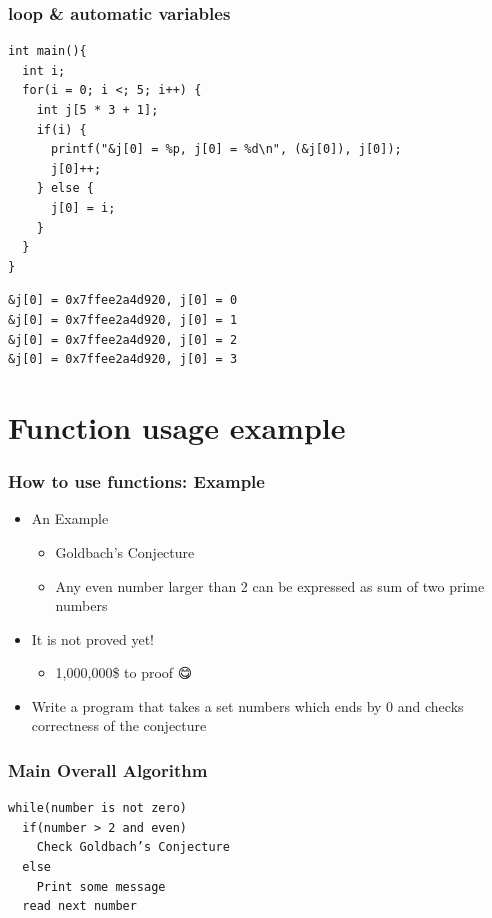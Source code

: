 \documentclass{../c-lecture}
\begin{document}
\begin{frame}[fragile]
  \frametitle{loop \& automatic variables}
  \begin{verbatim}
int main(){
  int i;
  for(i = 0; i <; 5; i++) {
    int j[5 * 3 + 1];
    if(i) {
      printf("&j[0] = %p, j[0] = %d\n", (&j[0]), j[0]);
      j[0]++;
    } else {
      j[0] = i;
    }
  }
}
  \end{verbatim}
\end{frame}

\begin{frame}[fragile]
  \begin{verbatim}
&j[0] = 0x7ffee2a4d920, j[0] = 0
&j[0] = 0x7ffee2a4d920, j[0] = 1
&j[0] = 0x7ffee2a4d920, j[0] = 2
&j[0] = 0x7ffee2a4d920, j[0] = 3
  \end{verbatim}
\end{frame}

\section{Function usage example}

\begin{frame}
  \frametitle{How to use functions: Example}
  \begin{itemize}
    \item An Example
    \begin{itemize}
      \item Goldbach’s Conjecture
      \item
        Any even number larger than 2 can be expressed as sum of two prime
        numbers

    \end{itemize}
    \item It is not proved yet!
    \begin{itemize}
      \item 1,000,000\$ to proof 😋
    \end{itemize}
    \item
      Write a program that takes a set numbers which ends by 0 and checks
      correctness of the conjecture
  \end{itemize}
\end{frame}

\begin{frame}[fragile]
  \frametitle{Main Overall Algorithm}
  \begin{verbatim}
while(number is not zero)
  if(number > 2 and even)
    Check Goldbach’s Conjecture
  else
    Print some message
  read next number
  \end{verbatim}
\end{frame}
\end{document}

